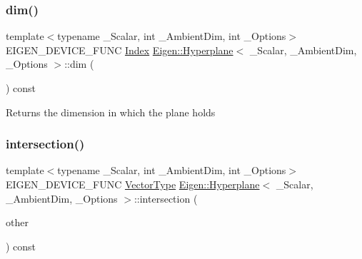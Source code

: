 \subsubsection{\texorpdfstring{dim()}{dim()}}
{\footnotesize\ttfamily template$<$typename \+\_\+\+Scalar, int \+\_\+\+Ambient\+Dim, int \+\_\+\+Options$>$ \\
E\+I\+G\+E\+N\+\_\+\+D\+E\+V\+I\+C\+E\+\_\+\+F\+U\+NC \mbox{\hyperlink{class_eigen_1_1_hyperplane_a58d2307d16128a0026021374e9e10465}{Index}} \mbox{\hyperlink{class_eigen_1_1_hyperplane}{Eigen\+::\+Hyperplane}}$<$ \+\_\+\+Scalar, \+\_\+\+Ambient\+Dim, \+\_\+\+Options $>$\+::dim (\begin{DoxyParamCaption}{ }\end{DoxyParamCaption}) const\hspace{0.3cm}{\ttfamily [inline]}}

\begin{DoxyReturn}{Returns}
the dimension in which the plane holds 
\end{DoxyReturn}
\mbox{\label{class_eigen_1_1_hyperplane_a9cb359548dd43991c372935f6bc3df61}} 
\subsubsection{\texorpdfstring{intersection()}{intersection()}}
{\footnotesize\ttfamily template$<$typename \+\_\+\+Scalar, int \+\_\+\+Ambient\+Dim, int \+\_\+\+Options$>$ \\
E\+I\+G\+E\+N\+\_\+\+D\+E\+V\+I\+C\+E\+\_\+\+F\+U\+NC \mbox{\hyperlink{class_eigen_1_1_matrix}{Vector\+Type}} \mbox{\hyperlink{class_eigen_1_1_hyperplane}{Eigen\+::\+Hyperplane}}$<$ \+\_\+\+Scalar, \+\_\+\+Ambient\+Dim, \+\_\+\+Options $>$\+::intersection (\begin{DoxyParamCaption}\item[{const \mbox{\hyperlink{class_eigen_1_1_hyperplane}{Hyperplane}}$<$ \+\_\+\+Scalar, \+\_\+\+Ambient\+Dim, \+\_\+\+Options $>$ \&}]{other }\end{DoxyParamCaption}) const\hspace{0.3cm}{\ttfamily [inline]}}

